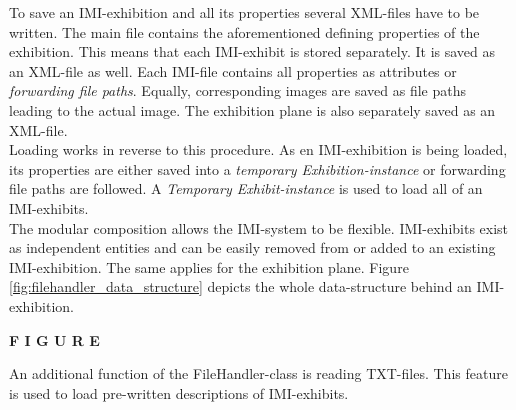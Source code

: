 To save an \ac{IMI}-exhibition and all its properties several XML-files have to be written. The main file contains the aforementioned defining properties of the exhibition. This means that each \ac{IMI}-exhibit is stored separately. It is saved as an XML-file as well. Each \ac{IMI}-file contains all properties as attributes or \textit{forwarding file paths}. Equally, corresponding images are saved as file paths leading to the actual image. The exhibition plane is also separately saved as an XML-file. 
\\
Loading works in reverse to this procedure. As en \ac{IMI}-exhibition is being loaded, its properties are either saved into a \textit{temporary Exhibition-instance} or forwarding file paths are followed. A \textit{Temporary Exhibit-instance} is used to load all of an \ac{IMI}-exhibits.
\\
The modular composition allows the \ac{IMI}-system to be flexible. \ac{IMI}-exhibits exist as independent entities and can be easily removed from or added to an existing \ac{IMI}-exhibition. The same applies for the exhibition plane. Figure \ref{fig:filehandler_data_structure} depicts the whole data-structure behind an \ac{IMI}-exhibition.

\textbf{F I G U R E}

An additional function of the FileHandler-class is reading TXT-files. This feature is used to load pre-written descriptions of \ac{IMI}-exhibits.


